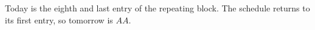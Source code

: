 Today is the eighth and last entry of the repeating block. The schedule returns to its first entry, so tomorrow is $\boxed{AA}$.
